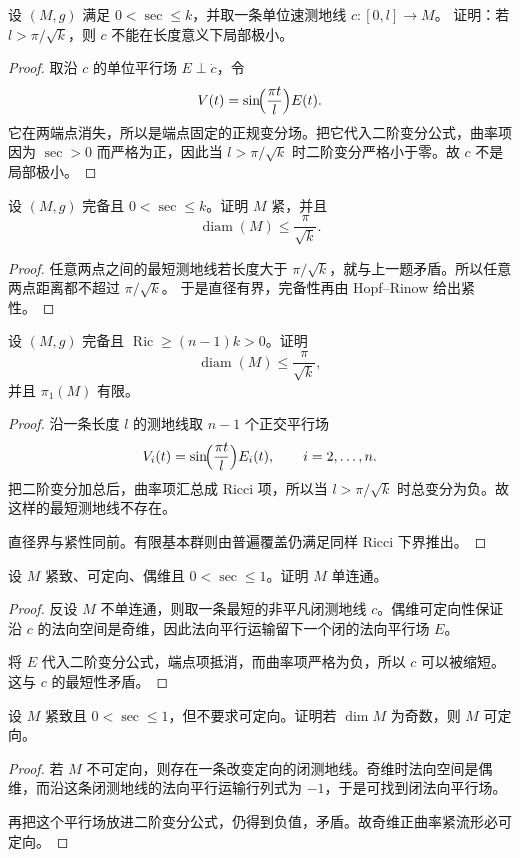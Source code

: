 \documentclass[11pt,a4paper,openany]{ctexbook}
\numberwithin{equation}{chapter}
\begin{document}
\begin{problem}
设 \((M,g)\) 满足 \(0<\sec\le k\)，并取一条单位速测地线 \(c\colon[0,l]\to M\)。
证明：若 \(l>\pi/\sqrt{k}\)，则 \(c\) 不能在长度意义下局部极小。
\end{problem}
\begin{proof}
取沿 \(c\) 的单位平行场 \(E\perp \dot c\)，令
\[
V(t)=\sin\!\Bigl(\frac{\pi t}{l}\Bigr)E(t).
\]
它在两端点消失，所以是端点固定的正规变分场。把它代入二阶变分公式，曲率项因为 \(\sec>0\) 而严格为正，因此当 \(l>\pi/\sqrt{k}\) 时二阶变分严格小于零。故 \(c\) 不是局部极小。
\end{proof}

\begin{problem}
设 \((M,g)\) 完备且 \(0<\sec\le k\)。证明 \(M\) 紧，并且
\[
\operatorname{diam}(M)\le \frac{\pi}{\sqrt{k}}.
\]
\end{problem}
\begin{proof}
任意两点之间的最短测地线若长度大于 \(\pi/\sqrt{k}\)，就与上一题矛盾。所以任意两点距离都不超过 \(\pi/\sqrt{k}\)。
于是直径有界，完备性再由 Hopf--Rinow 给出紧性。
\end{proof}

\begin{problem}
设 \((M,g)\) 完备且 \(\operatorname{Ric}\ge (n-1)k>0\)。证明
\[
\operatorname{diam}(M)\le \frac{\pi}{\sqrt{k}},
\]
并且 \(\pi_1(M)\) 有限。
\end{problem}
\begin{proof}
沿一条长度 \(l\) 的测地线取 \(n-1\) 个正交平行场
\[
V_i(t)=\sin\!\Bigl(\frac{\pi t}{l}\Bigr)E_i(t),\qquad i=2,\dots,n.
\]
把二阶变分加总后，曲率项汇总成 Ricci 项，所以当 \(l>\pi/\sqrt{k}\) 时总变分为负。故这样的最短测地线不存在。

直径界与紧性同前。有限基本群则由普遍覆盖仍满足同样 Ricci 下界推出。
\end{proof}

\begin{problem}
设 \(M\) 紧致、可定向、偶维且 \(0<\sec\le 1\)。证明 \(M\) 单连通。
\end{problem}
\begin{proof}
反设 \(M\) 不单连通，则取一条最短的非平凡闭测地线 \(c\)。偶维可定向性保证沿 \(c\) 的法向空间是奇维，因此法向平行运输留下一个闭的法向平行场 \(E\)。

将 \(E\) 代入二阶变分公式，端点项抵消，而曲率项严格为负，所以 \(c\) 可以被缩短。这与 \(c\) 的最短性矛盾。
\end{proof}

\begin{problem}
设 \(M\) 紧致且 \(0<\sec\le 1\)，但不要求可定向。证明若 \(\dim M\) 为奇数，则 \(M\) 可定向。
\end{problem}
\begin{proof}
若 \(M\) 不可定向，则存在一条改变定向的闭测地线。奇维时法向空间是偶维，而沿这条闭测地线的法向平行运输行列式为 \(-1\)，于是可找到闭法向平行场。

再把这个平行场放进二阶变分公式，仍得到负值，矛盾。故奇维正曲率紧流形必可定向。
\end{proof}
\end{document}
